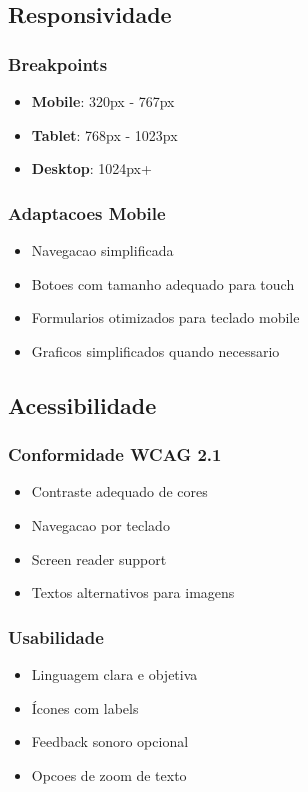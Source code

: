 \subsection{Responsividade}

\subsubsection{Breakpoints}
\begin{itemize}
    \item \textbf{Mobile}: 320px - 767px
    \item \textbf{Tablet}: 768px - 1023px
    \item \textbf{Desktop}: 1024px+
\end{itemize}

\subsubsection{Adaptacoes Mobile}
\begin{itemize}
    \item Navegacao simplificada
    \item Botoes com tamanho adequado para touch
    \item Formularios otimizados para teclado mobile
    \item Graficos simplificados quando necessario
\end{itemize}

\subsection{Acessibilidade}

\subsubsection{Conformidade WCAG 2.1}
\begin{itemize}
    \item Contraste adequado de cores
    \item Navegacao por teclado
    \item Screen reader support
    \item Textos alternativos para imagens
\end{itemize}

\subsubsection{Usabilidade}
\begin{itemize}
    \item Linguagem clara e objetiva
    \item Ícones com labels
    \item Feedback sonoro opcional
    \item Opcoes de zoom de texto
\end{itemize}
